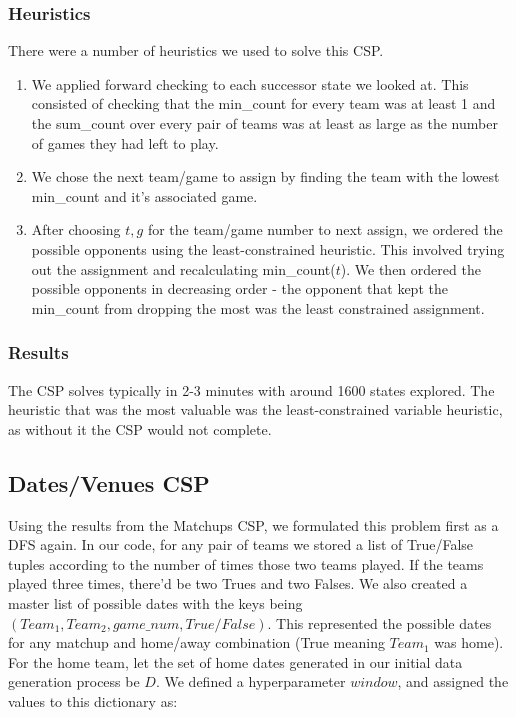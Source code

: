 \documentclass{article}
\begin{document}
	\subsubsection{Heuristics}
	There were a number of heuristics we used to solve this CSP.
	\begin{enumerate}
		\item We applied forward checking to each successor state we looked at. This consisted of checking that the min\_count for every team was at least 1 and the sum\_count over every pair of teams was at least as large as the number of games they had left to play.
		\item We chose the next team/game to assign by finding the team with the lowest min\_count and it's associated game.
		\item After choosing $t,g$ for the team/game number to next assign, we ordered the possible opponents using the least-constrained heuristic. This involved trying out the assignment and recalculating min\_count($t$). We then ordered the possible opponents in decreasing order - the opponent that kept the min\_count from dropping the most was the least constrained assignment.
	\end{enumerate}

	\subsubsection{Results}
	The CSP solves typically in 2-3 minutes with around 1600 states explored. The heuristic that was the most valuable was the least-constrained variable heuristic, as without it the CSP would not complete.

	\subsection{Dates/Venues CSP}
	Using the results from the Matchups CSP, we formulated this problem first as a DFS again. In our code, for any pair of teams we stored a list of True/False tuples according to the number of times those two teams played. If the teams played three times, there'd be two Trues and two Falses. We also created a master list of possible dates with the keys being $(Team_1,Team_2,game\_num,True/False)$. This represented the possible dates for any matchup and home/away combination (True meaning $Team_1$ was home). For the home team, let the set of home dates generated in our initial data generation process be $D$. We defined a hyperparameter $window$, and assigned the values to this dictionary as:
\end{document}
